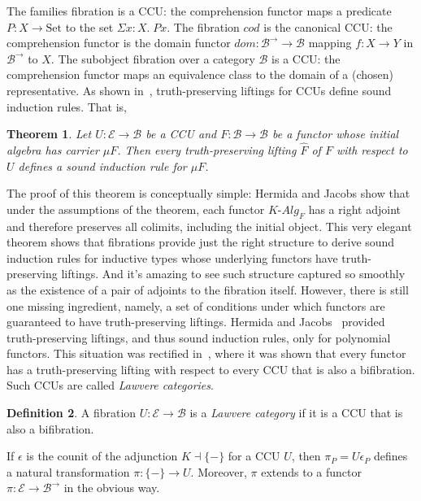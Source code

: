 \documentclass{LMCS}
\newcommand{\ra}{\rightarrow}
\newcommand{\Set}{\mbox{Set}}
\newcommand\E{{\mathcal E}}
\newcommand\B{{\mathcal B}}
\newcommand\alg{\mathit{Alg}}
\newcommand\dalg{\mbox{-}\!\alg}
\theoremstyle{plain}
\newtheorem{theorem}{Theorem}[section]
\theoremstyle{remark}
\theoremstyle{definition}
\newtheorem{definition}[theorem]{Definition}
\begin{document}
The families fibration is a CCU: the comprehension functor maps a
predicate $P: X \ra \Set$ to the set $\Sigma x\!:\!X. \; Px$.  The
fibration $\mathit{cod}$ is the canonical CCU: the comprehension
functor is the domain functor $\mathit{dom} : \B^\to \to \B$ mapping
$f :X \to Y$ in $\B^\to$ to $X$. The subobject fibration over a
category $\B$ is a CCU: the comprehension functor maps an equivalence
class to the domain of a (chosen) representative. As shown
in~\cite{hj98}, truth-preserving liftings for CCUs define sound
induction rules. That is,

\begin{theorem}\label{thm:ind}
  Let $U:\E\to\B$ be a CCU and $F:\B\to\B$ be a functor whose initial
  algebra has carrier $\mu F$. Then every truth-preserving lifting
  $\hat F$ of $F$ with respect to $U$ defines a sound induction rule
  for $\mu F$.
\end{theorem}

The proof of this theorem is conceptually simple: Hermida and Jacobs
show that under the assumptions of the theorem, each functor $K\dalg_F$
has a right adjoint and therefore preserves all colimits, including
the initial object. This very elegant theorem shows that fibrations
provide just the right structure to derive sound induction rules for
inductive types whose underlying functors have truth-preserving
liftings. And it's amazing to see such structure captured so smoothly
as the existence of a pair of adjoints to the fibration
itself. However, there is still one missing ingredient, namely, a set
of conditions under which functors are guaranteed to have
truth-preserving liftings. Hermida and Jacobs~\cite{hj98} provided
truth-preserving liftings, and thus sound induction rules, only for
polynomial functors. This situation was rectified in~\cite{gjf10},
where it was shown that every functor has a truth-preserving lifting
with respect to every CCU that is also a bifibration. Such CCUs are
called {\em Lawvere categories}.

\begin{definition}
  A fibration $U : \E \rightarrow \B$ is a {\em Lawvere category} if
  it is a CCU that is also a bifibration.
\end{definition}

If $\epsilon$ is the counit of the adjunction $K \dashv \{-\}$ for a
CCU $U$, then $\pi_P = U \epsilon_P$ defines a natural transformation
$\pi : \{-\} \rightarrow U$. 
Moreover, $\pi$ extends to a functor $\pi:\E \rightarrow
\B^{\rightarrow}$ in the obvious way.
\end{document}
